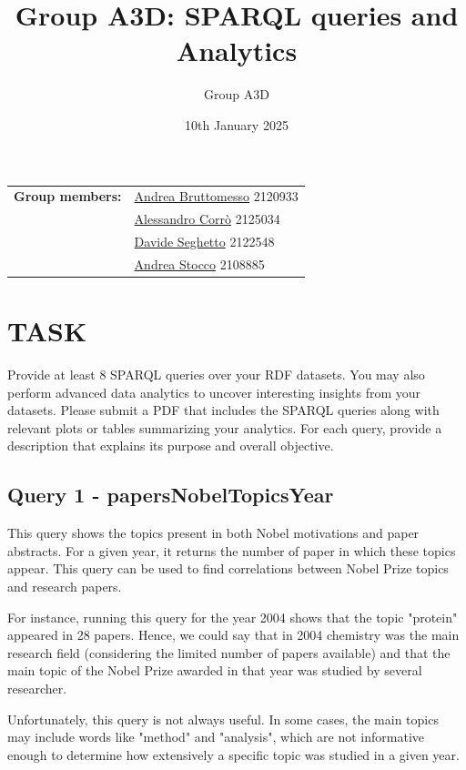 \documentclass{article}
\title{Group A3D: SPARQL queries and Analytics}
\author{Group A3D}
\date{10th January 2025}
\begin{document}
\maketitle

\begin{tabular}{@{}ll}
	\textbf{Group members:}
	 & \href{mailto:andrea.bruttomesso.1@studenti.unipd.it}{Andrea Bruttomesso} 2120933 \\
	 & \href{mailto:alessandro.corro.1@studenti.unipd.it}{Alessandro Corr\`o} 2125034   \\
	 & \href{mailto:davide.seghetto@studenti.unipd.it}{Davide Seghetto} 2122548         \\
	 & \href{mailto:andrea.stocco.8@studenti.unipd.it}{Andrea Stocco} 2108885           \\
\end{tabular}


\section*{TASK}
Provide at least 8 SPARQL queries over your RDF datasets. You may also perform advanced data analytics to uncover interesting insights from your datasets. Please submit a PDF that includes the SPARQL queries along with relevant plots or tables summarizing your analytics. For each query, provide a description that explains its purpose and overall objective.

\subsection*{Query 1 - papersNobelTopicsYear}
This query shows the topics present in both Nobel motivations and paper abstracts.
For a given year, it returns the number of paper in which these topics appear.
This query can be used to find correlations between Nobel Prize topics and research
papers.

For instance, running this query for the year 2004 shows that the topic "protein"
appeared in 28 papers. Hence, we could say that in 2004 chemistry was the main
research field (considering the limited number of papers available) and that the
main topic of the Nobel Prize awarded in that year was studied by several
researcher.

Unfortunately, this query is not always useful. In some cases, the
main topics may include words like "method" and "analysis", which are not
informative enough to determine how extensively a specific topic was studied
in a given year.
\end{document}
